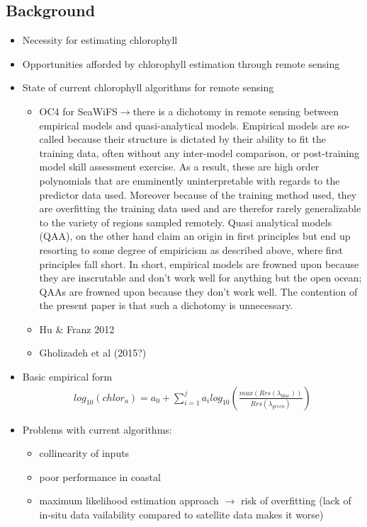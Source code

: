 \documentclass[10pt]{article}
\begin{document}
	\subsection{Background}
		\begin{itemize}
		\item Necessity for estimating chlorophyll
		\item Opportunities afforded by chlorophyll estimation through remote sensing
		\item State of current chlorophyll algorithms for remote sensing
		\begin{itemize}
		    \item OC4 for SeaWiFS$\rightarrow$there is a dichotomy in remote sensing between empirical models and quasi-analytical models. Empirical models are so-called because their structure is dictated by their ability to fit the training data, often without any inter-model comparison, or post-training model skill assessment exercise. As a result, these are high order polynomials that are emminently uninterpretable with regards to the predictor data used. Moreover because of the training method used, they are overfitting the training data used and are therefor rarely generalizable to the variety of regions sampled remotely. Quasi analytical models (QAA), on the other hand claim an origin in first principles but end up resorting to some degree of empiricism as described above, where first principles fall short. In short, empirical models are frowned upon because they are inscrutable and don't work well for anything but the open ocean; QAAs are frowned upon because they don't work well. The contention of the present paper is that such a dichotomy is unnecessary.
		    \item Hu \& Franz 2012
		    \item Gholizadeh et al (2015?)
		\end{itemize}
		\item Basic empirical form
		\begin{align}
		log_{10}\left(chlor_a\right) = a_0 + \sum_{i=1}^ja_ilog_{10}\left(\frac{max\left(Rrs	\left(\lambda_{blue}\right)\right)}{Rrs\left(\lambda_{green}\right)}\right)
		\end{align}
		\item Problems with current algorithms:
		\begin{itemize}
			\item collinearity of inputs
			\item poor performance in coastal
			\item maximum likelihood estimation approach $\rightarrow$ risk of overfitting (lack of in-situ data vailability  compared to satellite data makes it worse)
		\end{itemize}
	\end{itemize}
	
\end{document}

